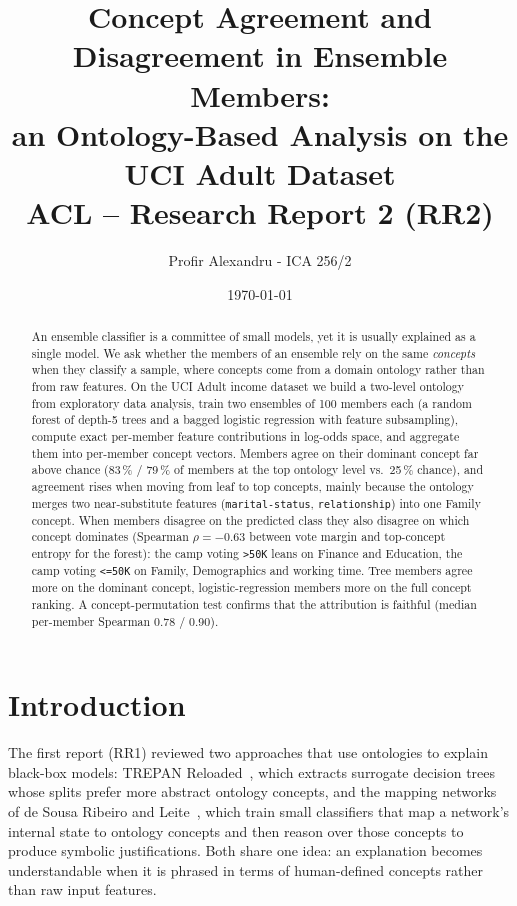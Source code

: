 \documentclass[11pt,a4paper]{article}
\title{Concept Agreement and Disagreement in Ensemble Members:\\
  an Ontology-Based Analysis on the UCI Adult Dataset\\[4pt]
  \large ACL -- Research Report 2 (RR2)}
\author{Profir Alexandru - ICA 256/2}
\date{\today}
\newcommand{\code}[1]{\texttt{#1}}
\newcommand{\concept}[1]{\textsf{#1}}
\begin{document}
\maketitle

\begin{abstract}
An ensemble classifier is a committee of small models, yet it is usually explained as a single model. We ask
whether the members of an ensemble rely on the same \emph{concepts} when they classify a sample, where concepts
come from a domain ontology rather than from raw features. On the UCI Adult income dataset we build a two-level
ontology from exploratory data analysis, train two ensembles of 100 members each (a random forest of depth-5 trees
and a bagged logistic regression with feature subsampling), compute exact per-member feature contributions in
log-odds space, and aggregate them into per-member concept vectors. Members agree on their dominant concept far
above chance (83\,\% / 79\,\% of members at the top ontology level vs.\ 25\,\% chance), and agreement rises when
moving from leaf to top concepts, mainly because the ontology merges two near-substitute features
(\code{marital-status}, \code{relationship}) into one \concept{Family} concept. When members disagree on the
predicted class they also disagree on which concept dominates (Spearman $\rho = -0.63$ between vote margin and
top-concept entropy for the forest): the camp voting \texttt{>50K} leans on \concept{Finance} and
\concept{Education}, the camp voting \texttt{<=50K} on \concept{Family}, \concept{Demographics} and working time.
Tree members agree more on the dominant concept, logistic-regression members more on the full concept ranking.
A concept-permutation test confirms that the attribution is faithful (median per-member Spearman 0.78 / 0.90).
\end{abstract}

\tableofcontents
\newpage

\section{Introduction}

The first report (RR1) reviewed two approaches that use ontologies to explain black-box models:
TREPAN Reloaded~\cite{confalonieri2021trepan}, which extracts surrogate decision trees whose splits prefer more
abstract ontology concepts, and the mapping networks of de Sousa Ribeiro and Leite~\cite{ribeiro2021aligning},
which train small classifiers that map a network's internal state to ontology concepts and then reason over
those concepts to produce symbolic justifications. Both share one idea: an explanation becomes understandable
when it is phrased in terms of human-defined concepts rather than raw input features.
\end{document}
